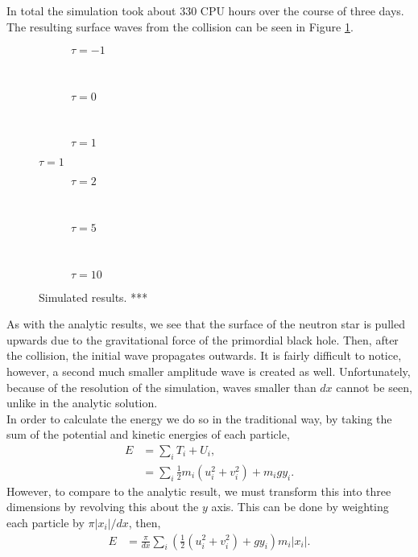 \documentclass[12pt]{report}
\begin{document}
In total the simulation took about 330 CPU hours over the course of three days. The resulting surface waves from the collision can be seen in Figure \ref{fig:simresults}.
\begin{figure}[p]
\centering
\begin{subfigure}{\textwidth}

\caption{$\tau = -1$}
\end{subfigure} \\
\begin{subfigure}{\textwidth}

\caption{$\tau = 0$}
\end{subfigure} \\
\begin{subfigure}{\textwidth}

\caption{$\tau = 1$}
\end{subfigure}
\end{figure}
\begin{figure}[p] \ContinuedFloat
\centering
\begin{subfigure}{\textwidth}

\caption{$\tau = 2$}
\end{subfigure} \\
\begin{subfigure}{\textwidth}

\caption{$\tau = 5$}
\end{subfigure} \\
\begin{subfigure}{\textwidth}

\caption{$\tau = 10$}
\end{subfigure}
\caption{Simulated results.  ***}
\label{fig:simresults}
\end{figure}
As with the analytic results, we see that the surface of the neutron star is pulled upwards due to the gravitational force of the primordial black hole. Then, after the collision, the initial wave propagates outwards. It is fairly difficult to notice, however, a second much smaller amplitude wave is created as well. Unfortunately, because of the resolution of the simulation, waves smaller than $dx$ cannot be seen, unlike in the analytic solution. \\

In order to calculate the energy we do so in the traditional way, by taking the sum of the potential and kinetic energies of each particle,
\begin{align*}
E &= \sum_i T_i + U_i, \\
&= \sum_i \frac{1}{2} m_i \left( u_i^2 + v_i^2 \right) + m_i g y_i.
\end{align*}
However, to compare to the analytic result, we must transform this into three dimensions by revolving this about the $y$ axis. This can be done by weighting each particle by $\pi |x_i| / dx$, then,
\begin{align*}
E &= \frac{\pi}{dx} \sum_i \left( \frac{1}{2} \left( u_i^2 + v_i^2 \right) + g y_i \right) m_i |x_i|.
\end{align*}
\end{document}
